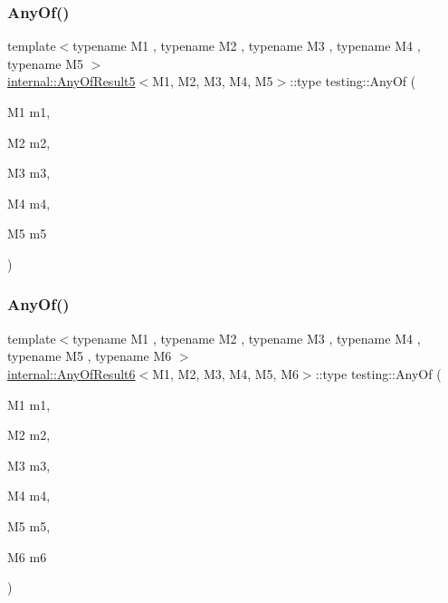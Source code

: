 \mbox{\label{namespacetesting_a049ea436e52c242adc44b2b42dc03e50}} 
\subsubsection{\texorpdfstring{AnyOf()}{AnyOf()}\hspace{0.1cm}{\footnotesize\ttfamily [4/9]}}
{\footnotesize\ttfamily template$<$typename M1 , typename M2 , typename M3 , typename M4 , typename M5 $>$ \\
\mbox{\hyperlink{structtesting_1_1internal_1_1_any_of_result5}{internal\+::\+Any\+Of\+Result5}}$<$M1, M2, M3, M4, M5$>$\+::type testing\+::\+Any\+Of (\begin{DoxyParamCaption}\item[{M1}]{m1,  }\item[{M2}]{m2,  }\item[{M3}]{m3,  }\item[{M4}]{m4,  }\item[{M5}]{m5 }\end{DoxyParamCaption})\hspace{0.3cm}{\ttfamily [inline]}}

\mbox{\label{namespacetesting_a747189264a49a426004366371f1a2575}} 
\subsubsection{\texorpdfstring{AnyOf()}{AnyOf()}\hspace{0.1cm}{\footnotesize\ttfamily [5/9]}}
{\footnotesize\ttfamily template$<$typename M1 , typename M2 , typename M3 , typename M4 , typename M5 , typename M6 $>$ \\
\mbox{\hyperlink{structtesting_1_1internal_1_1_any_of_result6}{internal\+::\+Any\+Of\+Result6}}$<$M1, M2, M3, M4, M5, M6$>$\+::type testing\+::\+Any\+Of (\begin{DoxyParamCaption}\item[{M1}]{m1,  }\item[{M2}]{m2,  }\item[{M3}]{m3,  }\item[{M4}]{m4,  }\item[{M5}]{m5,  }\item[{M6}]{m6 }\end{DoxyParamCaption})\hspace{0.3cm}{\ttfamily [inline]}}

